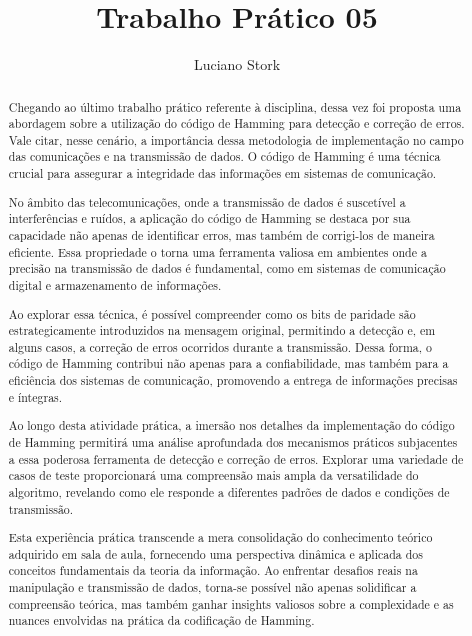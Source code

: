 \documentclass{article}
\title{Trabalho Prático 05}
\author{Luciano Stork}
\begin{document}
\maketitle

\begin{abstract}
Chegando ao último trabalho prático referente à disciplina, dessa vez foi proposta uma abordagem sobre a utilização do código de Hamming para detecção e correção de erros. Vale citar, nesse cenário, a importância dessa metodologia de implementação no campo das comunicações e na transmissão de dados. O código de Hamming é uma técnica crucial para assegurar a integridade das informações em sistemas de comunicação.

No âmbito das telecomunicações, onde a transmissão de dados é suscetível a interferências e ruídos, a aplicação do código de Hamming se destaca por sua capacidade não apenas de identificar erros, mas também de corrigi-los de maneira eficiente. Essa propriedade o torna uma ferramenta valiosa em ambientes onde a precisão na transmissão de dados é fundamental, como em sistemas de comunicação digital e armazenamento de informações.

Ao explorar essa técnica, é possível compreender como os bits de paridade são estrategicamente introduzidos na mensagem original, permitindo a detecção e, em alguns casos, a correção de erros ocorridos durante a transmissão. Dessa forma, o código de Hamming contribui não apenas para a confiabilidade, mas também para a eficiência dos sistemas de comunicação, promovendo a entrega de informações precisas e íntegras.

Ao longo desta atividade prática, a imersão nos detalhes da implementação do código de Hamming permitirá uma análise aprofundada dos mecanismos práticos subjacentes a essa poderosa ferramenta de detecção e correção de erros. Explorar uma variedade de casos de teste proporcionará uma compreensão mais ampla da versatilidade do algoritmo, revelando como ele responde a diferentes padrões de dados e condições de transmissão.

Esta experiência prática transcende a mera consolidação do conhecimento teórico adquirido em sala de aula, fornecendo uma perspectiva dinâmica e aplicada dos conceitos fundamentais da teoria da informação. Ao enfrentar desafios reais na manipulação e transmissão de dados, torna-se possível não apenas solidificar a compreensão teórica, mas também ganhar insights valiosos sobre a complexidade e as nuances envolvidas na prática da codificação de Hamming.


\end{abstract}
\end{document}
